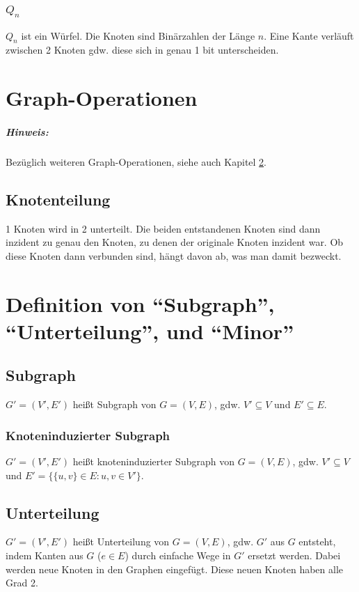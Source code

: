 \documentclass[a4paper,11pt]{report}
\begin{document}
\subsection{$Q_n$}
$Q_n$ ist ein Würfel. Die Knoten sind Binärzahlen der Länge $n$. Eine Kante verläuft zwischen 2 Knoten gdw. diese sich in genau 1 bit unterscheiden.


\chapter{Graph-Operationen}
\paragraph{Hinweis:} Bezüglich weiteren Graph-Operationen, siehe auch Kapitel \ref{ch:DefVonSubgrUntertMinor}.


\section{Knotenteilung}
1 Knoten wird in 2 unterteilt. Die beiden entstandenen Knoten sind dann inzident zu genau den Knoten, zu denen der originale Knoten inzident war. Ob diese Knoten dann verbunden sind, hängt davon ab, was man damit bezweckt.


\chapter{Definition von ``Subgraph'', ``Unterteilung'', und ``Minor''}
\label{ch:DefVonSubgrUntertMinor}
\section{Subgraph}
$G' = (V', E')$ heißt Subgraph von $G = (V, E)$, gdw. $V' \subseteq V$ und $E' \subseteq E$.


\subsection{Knoteninduzierter Subgraph}
$G' = (V', E')$ heißt knoteninduzierter Subgraph von $G = (V, E)$, gdw. $V' \subseteq V$ und $E' = \{ \{u, v\} \in E : u, v \in V' \}$.


\section{Unterteilung}
$G' = (V', E')$ heißt Unterteilung von $G = (V, E)$, gdw. $G'$ aus $G$ entsteht, indem Kanten aus $G$ ($e \in E$) durch einfache Wege in $G'$ ersetzt werden. Dabei werden neue Knoten in den Graphen eingefügt. Diese neuen Knoten haben alle Grad 2.
\end{document}
